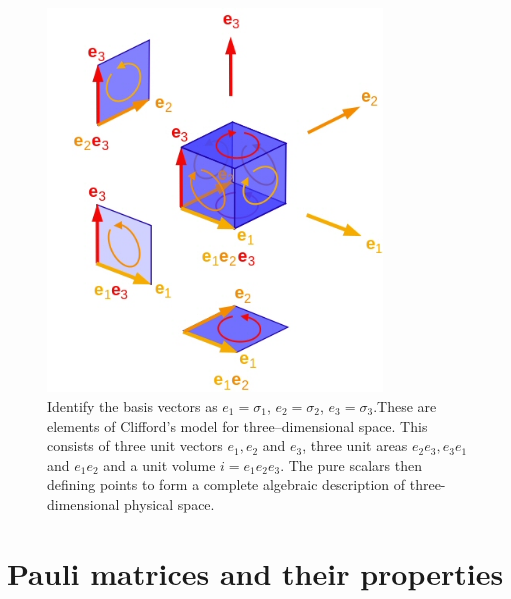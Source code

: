 \documentclass[10pt]{beamer}
\newcommand{\iGA}{{i}}
\begin{document}
\begin{frame}[shrink=25]{}

\begin{figure}[htb]
\begin{center}
\includegraphics[width=3.5in]{GeometrySpace}
\end{center}
\caption{Identify the basis vectors as $e_1 = \sigma_1$, $e_2 = \sigma_2$, $e_3 = \sigma_3$.These are elements of Clifford's model for three--dimensional space. This consists of three unit vectors $ e_1, e_2 $ and $ e_3 $, three unit areas $ e_2 e_3, e_3 e_1 $ and $ e_1 e_2 $ and a unit volume $ \iGA = e_1 e_2 e_3 $. The pure scalars then defining points to form a complete algebraic description of three-dimensional physical space. \label{ThreeSpace}}
\end{figure}
\end{frame}
 \section{Pauli matrices and their properties}
 
\end{document}
